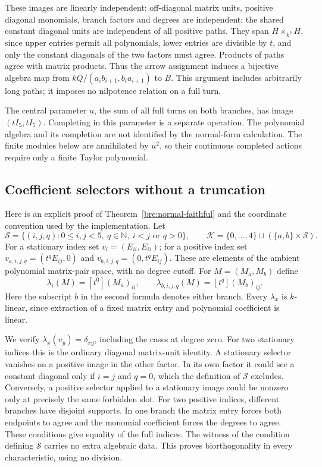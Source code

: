 \documentclass[11pt,oneside,openany]{book}
\theoremstyle{definition}\newtheorem{definition}[theorem]{Definition}
\theoremstyle{remark}\newtheorem{remark}[theorem]{Remark}
\begin{document}
These images are linearly independent: off-diagonal matrix units,
positive diagonal monomials, branch factors and degrees are independent;
the shared constant diagonal units are independent of all positive
paths. They span $H\times_{k^5}H$, since upper entries permit all
polynomials, lower entries are divisible by $t$, and only the constant
diagonals of the two factors must agree. Products of paths agree with
matrix products. Thus the arrow assignment induces a bijective algebra
map from $kQ/(a_ib_{i+1},b_ia_{i+1})$ to $B$. This argument includes
arbitrarily long paths; it imposes no nilpotence relation on a full turn.

The central parameter $u$, the sum of all full turns on both branches,
has image $(tI_5,tI_5)$. Completing in this parameter is a separate
operation. The polynomial algebra and its completion are not identified
by the normal-form calculation. The finite modules below are annihilated
by $u^2$, so their continuous completed actions require only a finite
Taylor polynomial.

\subsection{Coefficient selectors without a truncation}
Here is an explicit proof of Theorem~\ref{bre:normal-faithful} and the
coordinate convention used by the implementation. Let
\[
 \mathcal S=\{(i,j,q):0\leq i,j<5,\ q\in\mathbb N,
                      \ i<j\text{ or }q>0\},\qquad
 \mathcal K=\{0,\ldots,4\}\sqcup(\{a,b\}\times\mathcal S).
\]
For a stationary index set $v_i=(E_{ii},E_{ii})$; for a positive index
set $v_{a,i,j,q}=(t^qE_{ij},0)$ and
$v_{b,i,j,q}=(0,t^qE_{ij})$. These are elements of the ambient polynomial
matrix-pair space, with no degree cutoff. For $M=(M_a,M_b)$ define
\[
 \lambda_i(M)=[t^0](M_a)_{ii},\qquad
 \lambda_{b,i,j,q}(M)=[t^q](M_b)_{ij}.
\]
Here the subscript $b$ in the second formula denotes either branch.
Every $\lambda_x$ is $k$-linear, since extraction of a fixed matrix entry
and polynomial coefficient is linear.

We verify $\lambda_x(v_y)=\delta_{xy}$, including the cases at degree
zero. For two stationary indices this is the ordinary diagonal matrix-unit
identity. A stationary selector vanishes on a positive image in the other
factor. In its own factor it could see a constant diagonal only if
$i=j$ and $q=0$, which the definition of $\mathcal S$ excludes. Conversely,
a positive selector applied to a stationary image could be nonzero only
at precisely the same forbidden slot. For two positive indices, different
branches have disjoint supports. In one branch the matrix entry forces
both endpoints to agree and the monomial coefficient forces the degrees
to agree. These conditions give equality of the full indices. The witness
of the condition defining $\mathcal S$ carries no extra algebraic data.
This proves biorthogonality in every characteristic, using no division.
\end{document}
